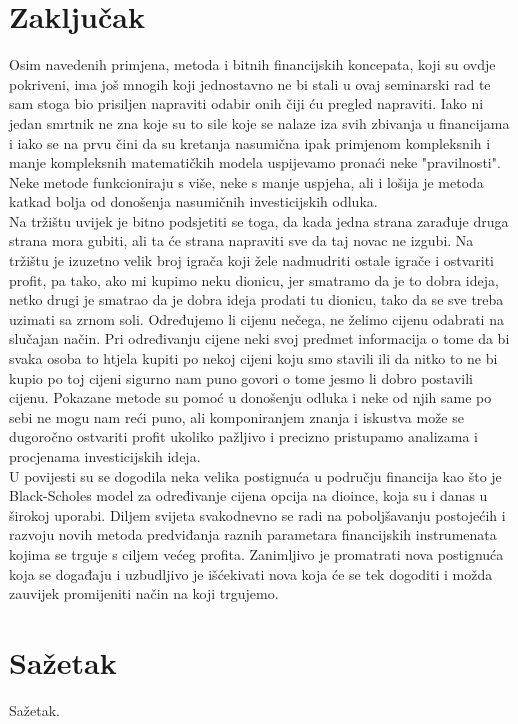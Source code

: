 \documentclass[times, utf8, seminar]{fer}
\begin{document}
\chapter{Zaključak}
Osim navedenih primjena, metoda i bitnih financijskih koncepata, koji su ovdje pokriveni, ima još mnogih koji jednostavno ne bi stali u ovaj seminarski rad te sam stoga bio prisiljen napraviti odabir onih čiji ću pregled napraviti. Iako ni jedan smrtnik ne zna koje su to sile koje se nalaze iza svih zbivanja u financijama i iako se na prvu čini da su kretanja nasumična ipak primjenom kompleksnih i manje kompleksnih matematičkih modela uspijevamo pronaći neke "pravilnosti". Neke metode funkcioniraju s više, neke s manje uspjeha, ali i lošija je metoda katkad bolja od donošenja nasumičnih investicijskih odluka.\\
Na tržištu uvijek je bitno podsjetiti se toga, da kada jedna strana zarađuje druga strana mora gubiti, ali ta će strana napraviti sve da taj novac ne izgubi. Na tržištu je izuzetno velik broj igrača koji žele nadmudriti ostale igrače i ostvariti profit, pa tako, ako mi kupimo neku dionicu, jer smatramo da je to dobra ideja, netko drugi je smatrao da je dobra ideja prodati tu dionicu, tako da se sve treba uzimati sa zrnom soli. Određujemo li cijenu nečega, ne želimo cijenu odabrati na slučajan način. Pri određivanju cijene neki svoj predmet informacija o tome da bi svaka osoba to htjela kupiti po nekoj cijeni koju smo stavili ili da nitko to ne bi kupio po toj cijeni sigurno nam puno govori o tome jesmo li dobro postavili cijenu. Pokazane metode su pomoć u donošenju odluka i neke od njih same po sebi ne mogu nam reći puno, ali komponiranjem znanja i iskustva može se dugoročno ostvariti profit ukoliko pažljivo i precizno pristupamo analizama i procjenama investicijskih ideja. \\
U povijesti su se dogodila neka velika postignuća u području financija kao što je Black-Scholes model za određivanje cijena opcija na dioince, koja su i danas u širokoj uporabi. Diljem svijeta svakodnevno se radi na poboljšavanju postojećih i razvoju novih metoda predviđanja raznih parametara financijskih instrumenata kojima se trguje s ciljem većeg profita. Zanimljivo je promatrati nova postignuća koja se događaju i uzbudljivo je išćekivati nova koja će se tek dogoditi i možda zauvijek promijeniti način na koji trgujemo.




\chapter{Sažetak}
Sažetak.
\end{document}
